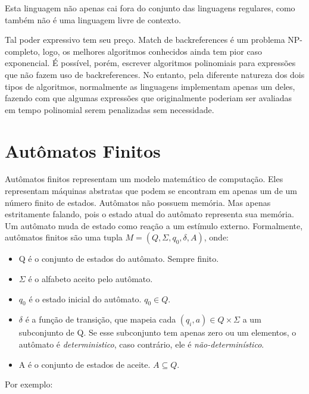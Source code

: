 \documentclass[a4paper,12pt,oneside,onecolumn]{uerj}
\begin{document}
Esta linguagem não apenas cai fora do conjunto das linguagens regulares, como também não é uma linguagem livre de contexto.

Tal poder expressivo tem seu preço. Match de backreferences é um problema NP-completo, logo, os melhores algoritmos conhecidos ainda tem pior caso exponencial. É possível, porém, escrever algoritmos polinomiais para expressões que não fazem uso de backreferences. No entanto, pela diferente natureza dos dois tipos de algoritmos, normalmente as linguagens implementam apenas um deles, fazendo com que algumas expressões que originalmente poderiam ser avaliadas em tempo polinomial serem penalizadas sem necessidade.

\section{Autômatos Finitos}

Autômatos finitos representam um modelo matemático de computação. Eles representam máquinas abstratas que podem se encontram em apenas um de um número finito de estados. Autômatos não possuem memória. Mas apenas estritamente falando, pois o estado atual do autômato representa sua memória. Um autômato muda de estado como reação a um estímulo externo. Formalmente, autômatos finitos são uma tupla $M = (Q, \Sigma, q_0, \delta, A)$, onde:

\begin{itemize}
    \item Q é o conjunto de estados do autômato. Sempre finito.
    \item $\Sigma$ é o alfabeto aceito pelo autômato.
    \item $q_0$ é o estado inicial do autômato. $q_0 \in Q$.
    \item $\delta$ é a função de transição, que mapeia cada $(q_i, a) \in Q \times \Sigma$ a um subconjunto de Q. Se esse subconjunto tem apenas zero ou um elementos, o autômato é \emph{deterministico}, caso contrário, ele é \emph{não-determinístico}.
    \item A é o conjunto de estados de aceite. $A \subseteq Q$.
\end{itemize}

Por exemplo:
\end{document}
